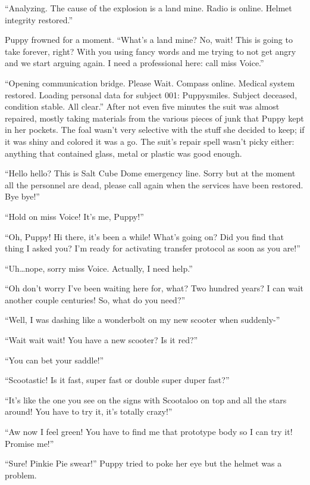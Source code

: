 ``{\mt Analyzing. The cause of the explosion is a land mine. Radio is online. Helmet integrity restored.}''

Puppy frowned for a moment. ``What's a land mine? No, wait! This is going to take forever, right? With you using fancy words and me trying to not get angry and we start arguing again. I need a professional here: call miss Voice.''

``{\mt Opening communication bridge. Please Wait. Compass online. Medical system restored. Loading personal data for subject 001: Puppysmiles. Subject deceased, condition stable. All clear.}'' After not even five minutes the suit was almost repaired, mostly taking materials from the various pieces of junk that Puppy kept in her pockets. The foal wasn't very selective with the stuff she decided to keep; if it was shiny and colored it was a go. The suit's repair spell wasn't picky either: anything that contained glass, metal or plastic was good enough.

``Hello hello? This is Salt Cube Dome emergency line. Sorry but at the moment all the personnel are dead, please call again when the services have been restored. Bye bye!''

``Hold on miss Voice! It's me, Puppy!''

``Oh, Puppy! Hi there, it's been a while! What's going on? Did you find that thing I asked you? I'm ready for activating transfer protocol as soon as you are!''

``Uh\dots nope, sorry miss Voice. Actually, I need help.''

``Oh don't worry I've been waiting here for, what? Two hundred years? I can wait another couple centuries! So, what do you need?''

``Well, I was dashing like a wonderbolt on my new scooter when suddenly-''

``Wait wait wait! You have a new scooter? Is it red?''

``You can bet your saddle!''

``Scootastic! Is it fast, super fast or double super duper fast?''

``It's like the one you see on the signs with Scootaloo on top and all the stars around! You have to try it, it's totally crazy!''

``Aw now I feel green! You have to find me that prototype body so I can try it! Promise me!''

``Sure! Pinkie Pie swear!'' Puppy tried to poke her eye but the helmet was a problem.

